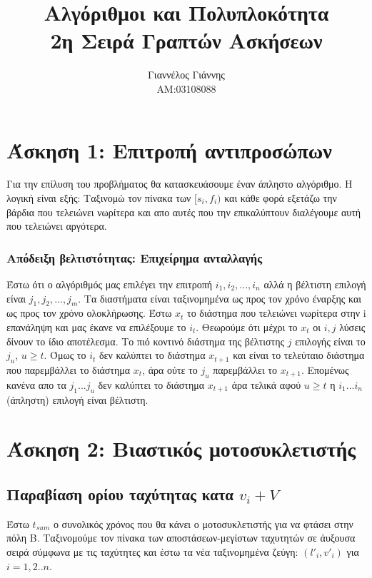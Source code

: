 \documentclass[a4paper,12pt]{report}
\title{ Αλγόριθμοι και Πολυπλοκότητα \\ 2η Σειρά Γραπτών Ασκήσεων}
\author{Γιαννέλος Γιάννης\\ΑΜ:03108088}
\begin{document}
\maketitle

\section*{Άσκηση 1: Επιτροπή αντιπροσώπων}
Για την επίλυση του προβλήματος θα κατασκευάσουμε έναν άπληστο αλγόριθμο. Η λογική είναι εξής: Ταξινομώ τον πίνακα των $[s_i,f_i)$ και κάθε φορά εξετάζω την βάρδια που τελειώνει νωρίτερα και απο αυτές που την επικαλύπτουν διαλέγουμε αυτή που τελειώνει αργότερα.
\subsubsection*{Απόδειξη βελτιστότητας: Επιχείρημα ανταλλαγής}
Έστω ότι ο αλγόριθμός μας επιλέγει την επιτροπή $i_1,i_2,...,i_n$ αλλά η βέλτιστη επιλογή είναι $j_1,j_2,...,j_m$. Τα διαστήματα είναι ταξινομημένα ως προς τον χρόνο έναρξης και ως προς τον χρόνο ολοκλήρωσης. Έστω $x_t$ το διάστημα που τελειώνει νωρίτερα στην i επανάληψη και μας έκανε να επιλέξουμε το $i_t$. Θεωρούμε ότι μέχρι το $x_t$ οι $i,j$ λύσεις δίνουν το ίδιο αποτέλεσμα. Το πιό κοντινό διάστημα της βέλτιστης $j$ επιλογής είναι το $j_u$, $u\geq t$. Όμως το $i_t$ δεν καλύπτει το διάστημα $x_{t+1}$ και είναι το τελεύταιο διάστημα που παρεμβάλλει το διάστημα $x_t$, άρα ούτε το $j_u$ παρεμβάλλει το $x_{t+1}$. Επομένως κανένα απο τα $j_1...j_u$ δεν καλύπτει το διάστημα $x_{t+1}$ άρα τελικά αφού $u \geq t$ η $i_1...i_n$ (άπληστη) επιλογή είναι βέλτιστη.


\section*{Άσκηση 2: Βιαστικός μοτοσυκλετιστής}
\subsection*{Παραβίαση ορίου ταχύτητας κατα $v_i+V$}
Έστω $t_{sum}$ ο συνολικός χρόνος που θα κάνει ο μοτοσυκλετιστής για να φτάσει στην πόλη Β. Ταξινομούμε τον πίνακα των αποστάσεων-μεγίστων ταχυτητών σε άυξουσα σειρά σύμφωνα με τις ταχύτητες και έστω τα νέα ταξινομημένα ζεύγη: $(l'_i,v'_i)$ για $i=1,2..n$.
\end{document}
